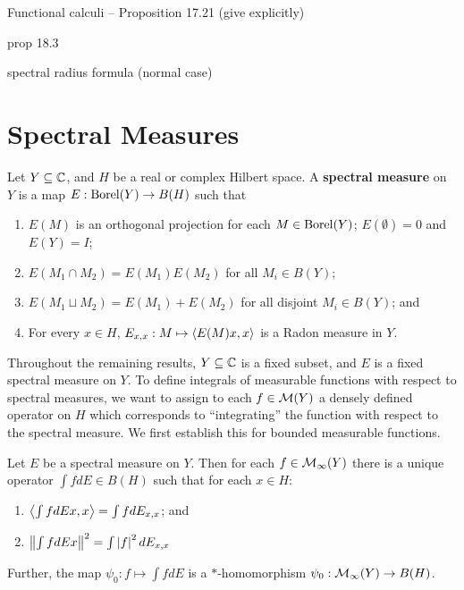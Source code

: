 \documentclass[10pt]{amsart}
\begin{document}
Functional calculi -- Proposition 17.21 (give explicitly)

prop 18.3

spectral radius formula (normal case)

\section{Spectral Measures}
\begin{definition}
    Let $Y \subseteq \mathbb{C}$, and $H$ be a real or complex Hilbert space. A \textbf{spectral measure} on $Y$ is a map $E : \operatorname{Borel}(Y) \to B(H)$ such that
    \begin{enumerate}
        \item $E(M)$ is an orthogonal projection for each $M \in \operatorname{Borel}(Y)$; $E(\emptyset) = 0$ and $E(Y) = I$;
        \item $E(M_1 \cap M_2) = E(M_1)E(M_2)$ for all $M_i \in B(Y)$;
        \item $E(M_1 \sqcup M_2) = E(M_1) + E(M_2)$ for all disjoint $M_i \in B(Y)$; and
        \item For every $x \in H$, $E_{x, x} : M \mapsto \left\langle E(M)x, x \right\rangle$ is a Radon measure in $Y$.
    \end{enumerate}
\end{definition}
Throughout the remaining results, $Y \subseteq \mathbb{C}$ is a fixed subset, and $E$ is a fixed spectral measure on $Y$. To define integrals of measurable functions with respect to spectral measures, we want to assign to each $f \in \mathcal{M}(Y)$ a densely defined operator on $H$ which corresponds to ``integrating'' the function with respect to the spectral measure. We first establish this for bounded measurable functions.
\begin{lemma}\label{bdint}
    Let $E$ be a spectral measure on $Y$. Then for each $f \in \mathcal{M}_\infty(Y)$ there is a unique operator $\int f dE \in B(H)$ such that for each $x \in H$:
    \begin{enumerate}
        \item $\left\langle \int f dEx, x \right\rangle = \int f dE_{x, x}$; and
        \item $\left\| \int f dE x \right\|^2 = \int\left| f \right|^2 dE_{x, x}$
    \end{enumerate}
    Further, the map $\psi_0 : f \mapsto \int f dE$ is a $*$-homomorphism $\psi_0 : \mathcal{M}_\infty(Y) \to B(H)$.
\end{lemma}
\end{document}

